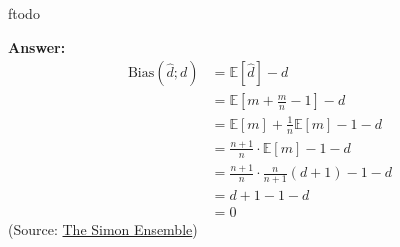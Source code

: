 ƒtodo\documentclass{article}
\newenvironment{QandA}{\begin{enumerate}[label=\arabic*.]}{\end{enumerate}}
\newenvironment{answer}{\par\normalfont \textbf{Answer:}}{}
\newcommand{\Exp}[1]{\mathbb{E}\left[ #1 \right]}
\begin{document}
\begin{QandA}
\begin{answer}
        \begin{align*}
            \text{Bias}(\hat{d}; d) &= \Exp{\hat{d}} - d \\
            &= \Exp{m + \frac{m}{n} - 1 } - d \\
            &= \Exp{m} + \frac{1}{n}\Exp{m} - 1 -d \\
            &= \frac{n+1}{n} \cdot \Exp{m} - 1 - d \\
            &= \frac{n+1}{n} \cdot \frac{n}{n+1}(d+1) - 1 - d \\
            &= d + 1 - 1 - d \\
            &= 0
        \end{align*}
        (Source: \href{https://simonensemble.github.io/2019-11/german-tank-problem}{The Simon Ensemble})
    \end{answer}
    

\end{QandA}
\end{document}
